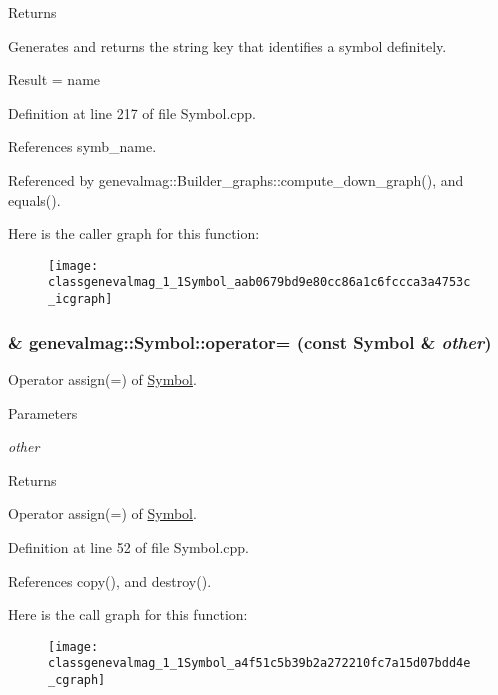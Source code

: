 \begin{DoxyReturn}{Returns}

\end{DoxyReturn}
Generates and returns the string key that identifies a symbol definitely.

Result = name 

Definition at line 217 of file Symbol.cpp.



References symb\_\-name.



Referenced by genevalmag::Builder\_\-graphs::compute\_\-down\_\-graph(), and equals().



Here is the caller graph for this function:\nopagebreak
\begin{figure}[H]
\begin{center}
\leavevmode
\texttt{[image: classgenevalmag\_1\_1Symbol\_aab0679bd9e80cc86a1c6fccca3a4753c\_icgraph]}
\end{center}
\end{figure}


\hypertarget{classgenevalmag_1_1Symbol_a4f51c5b39b2a272210fc7a15d07bdd4e}{
\subsubsection[{operator=}]{ \& genevalmag::Symbol::operator= (const {\bf Symbol} \& {\em other})}}
\label{classgenevalmag_1_1Symbol_a4f51c5b39b2a272210fc7a15d07bdd4e}
Operator assign(=) of \hyperlink{classgenevalmag_1_1Symbol}{Symbol}. 
\begin{DoxyParams}{Parameters}
\item[{\em other}]\end{DoxyParams}
\begin{DoxyReturn}{Returns}

\end{DoxyReturn}
Operator assign(=) of \hyperlink{classgenevalmag_1_1Symbol}{Symbol}. 

Definition at line 52 of file Symbol.cpp.



References copy(), and destroy().



Here is the call graph for this function:\nopagebreak
\begin{figure}[H]
\begin{center}
\leavevmode
\texttt{[image: classgenevalmag\_1\_1Symbol\_a4f51c5b39b2a272210fc7a15d07bdd4e\_cgraph]}
\end{center}
\end{figure}


